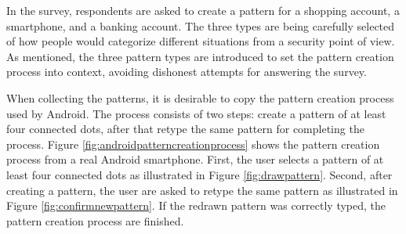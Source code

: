     In the survey, respondents are asked to create a pattern for a shopping account, a smartphone, and a banking account. The three types are being carefully selected of how people would categorize different situations from a security point of view. As mentioned, the three pattern types are introduced to set the pattern creation process into context, avoiding dishonest attempts for answering the survey. 

    When collecting the patterns, it is desirable to copy the pattern creation process used by Android. The process consists of two steps: create a pattern of at least four connected dots, after that retype the same pattern for completing the process. Figure \ref{fig:androidpatterncreationprocess} shows the pattern creation process from a real Android smartphone. First, the user selects a pattern of at least four connected dots as illustrated in Figure \ref{fig:drawpattern}. Second, after creating a pattern, the user are asked to retype the same pattern as illustrated in Figure \ref{fig:confirmnewpattern}. If the redrawn pattern was correctly typed, the pattern creation process are finished.

